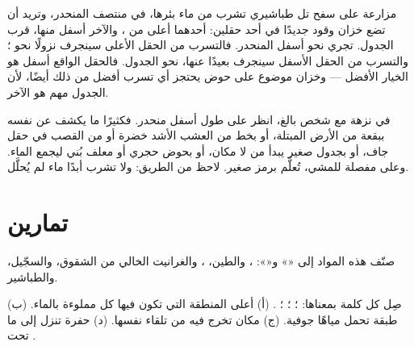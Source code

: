 \begin{example}\label{ex:g6:water-underground:tank}
مزارعة على سفح تل طباشيري تشرب من ماء بئرها، في منتصف
المنحدر، وتريد أن تضع خزان وقود جديدًا في أحد حقلين: أحدهما
أعلى من ، والآخر أسفل منها، قرب الجدول. 
تجري نحو أسفل المنحدر. فالتسرب من الحقل الأعلى سينجرف نزولًا نحو
؛ والتسرب من الحقل الأسفل سينجرف بعيدًا عنها، نحو
الجدول. فالحقل الواقع أسفل  هو الخيار الأفضل 
--- وخزان موضوع على حوض يحتجز أي تسرب أفضل من ذلك أيضًا، لأن
الجدول مهم هو الآخر.
\end{example}

\begin{inthefield}
في نزهة مع شخص بالغ، انظر على طول أسفل منحدر. فكثيرًا ما يكشف
 عن نفسه ببقعة من الأرض المبتلة، أو بخط من العشب الأشد خضرة أو من القصب
في حقل جاف، أو بجدول صغير يبدأ من لا مكان، أو بحوض حجري أو
معلف بُني ليجمع الماء. وعلى  مفصلة للمشي، تُعلَّم 
برمز صغير. لاحظ من الطريق: ولا تشرب أبدًا
ماء  لم يُحلَّل.
\end{inthefield}

\section{تمارين}

\begin{exercise}[$\star$]\label{exo:g6:water-underground:1}
صنّف هذه المواد إلى «» و«»: ،
والطين، ، والغرانيت الخالي من الشقوق، والسجّيل، والطباشير.
\end{exercise}

\begin{exercise}[$\star$]\label{exo:g6:water-underground:2}
صِل كل كلمة بمعناها: ؛ ؛ ؛ .
(أ) أعلى المنطقة التي تكون فيها كل  مملوءة بالماء. (ب) طبقة
  تحمل مياهًا جوفية. (ج) مكان تخرج فيه
 من تلقاء نفسها. (د) حفرة تنزل إلى ما تحت .
\end{exercise}

